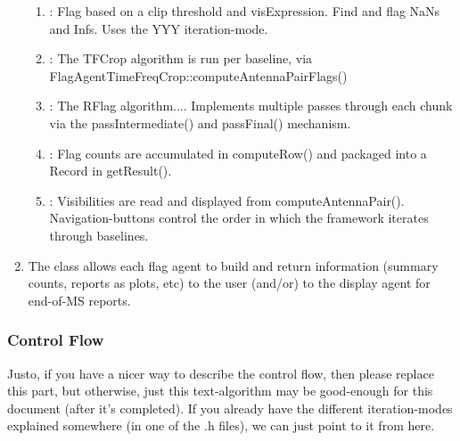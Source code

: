 \begin{enumerate}
\begin{enumerate}
\item {} :  Flag based on a clip threshold and visExpression.
Find and flag NaNs and Infs.  Uses the YYY iteration-mode. 

\item {} : The TFCrop algorithm is run per
baseline, via FlagAgentTimeFreqCrop::computeAntennaPairFlags()

\item {} : The RFlag algorithm....
Implements multiple passes through each chunk via the  passIntermediate() and passFinal() mechanism.

\item {} : Flag counts are accumulated in computeRow()
and packaged into a Record in getResult(). 

\item {} : Visibilities are read and displayed from computeAntennaPair(). Navigation-buttons control the order in which the framework iterates through baselines. 

\end{enumerate}



\item The  class allows each flag agent to build and return 
information (summary counts, reports as plots, etc) to the user (and/or) to the display agent
for end-of-MS reports.
\end{enumerate}


\subsubsection{Control Flow}
{\green  Justo, if you have a nicer way to describe the control flow, then please replace this part,  but otherwise, just this text-algorithm may be good-enough for this document (after it's completed).  If you already have the different iteration-modes explained somewhere (in one of the .h files), we can just point to it from here.  }



